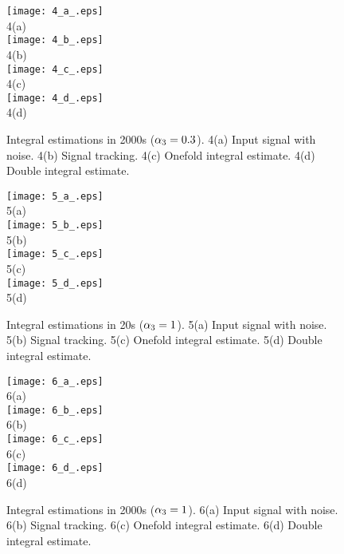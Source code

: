 \documentclass[10pt,journal]{IEEEtran}
\begin{document}
\begin{figure}[H]
\begin{center}
\texttt{[image: 4\_a\_.eps]}\\[0pt]
{\small 4(a)}\\[0pt]
\texttt{[image: 4\_b\_.eps]}\\[0pt]
{\small 4(b)}\\[0pt]
\texttt{[image: 4\_c\_.eps]}\\[0pt]
{\small 4(c)}\\[0pt]
\texttt{[image: 4\_d\_.eps]}\\[0pt]
{\small 4(d)}
\end{center}
\caption{Integral estimations in 2000s ($\protect\alpha _{3}=0.3$). 4(a)
Input signal with noise. 4(b) Signal tracking. 4(c) Onefold integral
estimate. 4(d) Double integral estimate.}
\end{figure}

\begin{figure}[H]
\begin{center}
\texttt{[image: 5\_a\_.eps]}\\[0pt]
{\small 5(a)}\\[0pt]
\texttt{[image: 5\_b\_.eps]}\\[0pt]
{\small 5(b)}\\[0pt]
\texttt{[image: 5\_c\_.eps]}\\[0pt]
{\small 5(c)}\\[0pt]
\texttt{[image: 5\_d\_.eps]}\\[0pt]
{\small 5(d)}
\end{center}
\caption{Integral estimations in 20s ($\protect\alpha _{3}=1$). 5(a) Input
signal with noise. 5(b) Signal tracking. 5(c) Onefold integral estimate. 5(d)
Double integral estimate.}
\end{figure}

\begin{figure}[H]
\begin{center}
\texttt{[image: 6\_a\_.eps]}\\[0pt]
{\small 6(a)}\\[0pt]
\texttt{[image: 6\_b\_.eps]}\\[0pt]
{\small 6(b)}\\[0pt]
\texttt{[image: 6\_c\_.eps]}\\[0pt]
{\small 6(c)}\\[0pt]
\texttt{[image: 6\_d\_.eps]}\\[0pt]
{\small 6(d)}
\end{center}
\caption{Integral estimations in 2000s ($\protect\alpha _{3}=1$). 6(a) Input
signal with noise. 6(b) Signal tracking. 6(c) Onefold integral estimate. 6(d)
Double integral estimate.}
\end{figure}
\end{document}
